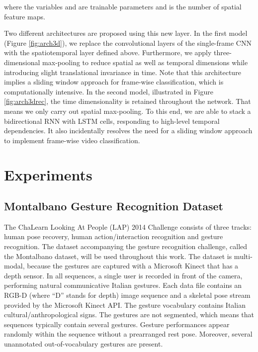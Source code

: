 \documentclass[11pt,a4paper]{article} \usepackage{a4wide}
\begin{document}
where the variables  and  are trainable parameters and  is the number of spatial feature maps.






Two different architectures are proposed using this new layer. In the first model (Figure \ref{fig:arch3d}), we replace the convolutional layers of the single-frame CNN with the spatiotemporal layer defined above. Furthermore, we apply three-dimensional max-pooling to reduce spatial as well as temporal dimensions while introducing slight translational invariance in time. Note that this architecture implies a sliding window approach for frame-wise classification, which is computationally intensive.
In the second model, illustrated in Figure \ref{fig:arch3drec}, the time dimensionality is retained throughout the network. That means we only carry out spatial max-pooling. To this end, we are able to stack a bidirectional RNN with LSTM cells, responding to high-level temporal dependencies. It also incidentally resolves the need for a sliding window approach to implement frame-wise video classification.






\section{Experiments} \label{sec:exp}

\subsection{Montalbano Gesture Recognition Dataset} \label{sec:dataset}
The ChaLearn Looking At People (LAP) 2014 Challenge \citep{chalearn14} consists of three tracks: human pose recovery, human action/interaction recognition and gesture recognition. The dataset accompanying the gesture recognition challenge, called the Montalbano dataset, will be used throughout this work. The dataset is multi-modal, because the gestures are captured with a Microsoft Kinect that has a depth sensor. In all sequences, a single user is recorded in front of the camera, performing natural communicative Italian gestures. Each data file contains an RGB-D (where ``D'' stands for depth) image sequence and a skeletal pose stream provided by the Microsoft Kinect API. The gesture vocabulary contains  Italian cultural/anthropological signs. The gestures are not segmented, which means that sequences typically contain several gestures. Gesture performances appear randomly within the sequence without a prearranged rest pose. Moreover, several unannotated out-of-vocabulary gestures are present. 
\end{document}

